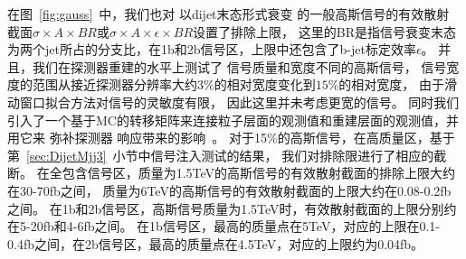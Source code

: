 在图~\ref{fig:gauss}~中，我们也对
以dijet末态形式衰变
的一般高斯信号的有效散射
截面$\sigma\times A \times BR$或$\sigma\times A \times \epsilon \times BR$设置了排除上限，
这里的BR是指信号衰变末态为两个jet所占的分支比，在1b和2b信号区，上限中还包含了b-jet标定效率$\epsilon$。
并且，我们在探测器重建的水平上测试了
信号质量和宽度不同的高斯信号，
信号宽度的范围从接近探测器分辨率大约$3\%$的相对宽度变化到$15\%$的相对宽度，
由于滑动窗口拟合方法对信号的灵敏度有限，
因此这里并未考虑更宽的信号。
同时我们引入了一个基于MC的转移矩阵来连接粒子层面的观测值和重建层面的观测值，并用它来
弥补探测器
响应带来的影响~\cite{EXOT-2016-21}。
对于15\%的高斯信号，在高质量区，基于第~\ref{sec:DijetMjj3}~小节中信号注入测试的结果，
我们对排除限进行了相应的截断。
在全包含信号区，质量为1.5TeV的高斯信号的有效散射截面的排除上限大约在30-70fb之间，
质量为6TeV的高斯信号的有效散射截面的上限大约在0.08-0.2fb之间。
在1b和2b信号区，高斯信号质量为1.5TeV时，有效散射截面的上限分别约在5-20fb和4-6fb之间。
在1b信号区，最高的质量点在5TeV，对应的上限在0.1-0.4fb之间，在2b信号区，最高的质量点在4.5TeV，对应的上限约为0.04fb。





